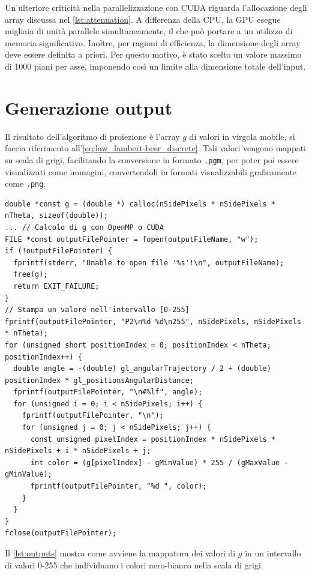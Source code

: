 \documentclass[12pt,a4paper]{report}
\begin{document}
Un'ulteriore criticità nella parallelizzazione con CUDA riguarda l'allocazione degli array discussa nel \autoref{lst:attenuation}.
A differenza della CPU, la GPU esegue migliaia di unità parallele simultaneamente, il che può portare a un utilizzo di memoria
significativo.
Inoltre, per ragioni di efficienza, la dimensione degli array deve essere definita a priori.
Per questo motivo, è stato scelto un valore massimo di 1000 piani per asse, imponendo così un limite alla dimensione totale
dell'input.

\section{Generazione output}

Il risultato dell'algoritmo di proiezione è l'array \(g\) di valori in virgola mobile, si faccia riferimento
all'\autoref{eq:law_lambert-beer_discrete}.
Tali valori vengono mappati su scala di grigi, facilitando la conversione in formato \lstinline{.pgm}, per poter poi essere
visualizzati come immagini, convertendoli in formati visualizzabili graficamente come \lstinline{.png}.

\begin{lstlisting}[language=CStyle, caption={Codice C per la mappatura dell'output in immagini.}, label={lst:outputs}]
double *const g = (double *) calloc(nSidePixels * nSidePixels * nTheta, sizeof(double));
... // Calcolo di g con OpenMP o CUDA
FILE *const outputFilePointer = fopen(outputFileName, "w");
if (!outputFilePointer) {
  fprintf(stderr, "Unable to open file '%s'!\n", outputFileName);
  free(g);
  return EXIT_FAILURE;
}
// Stampa un valore nell'intervallo [0-255]
fprintf(outputFilePointer, "P2\n%d %d\n255", nSidePixels, nSidePixels * nTheta);
for (unsigned short positionIndex = 0; positionIndex < nTheta; positionIndex++) {
  double angle = -(double) gl_angularTrajectory / 2 + (double) positionIndex * gl_positionsAngularDistance;
  fprintf(outputFilePointer, "\n#%lf", angle);
  for (unsigned i = 0; i < nSidePixels; i++) {
    fprintf(outputFilePointer, "\n");
    for (unsigned j = 0; j < nSidePixels; j++) {
      const unsigned pixelIndex = positionIndex * nSidePixels * nSidePixels + i * nSidePixels + j;
      int color = (g[pixelIndex] - gMinValue) * 255 / (gMaxValue - gMinValue);
      fprintf(outputFilePointer, "%d ", color);
    }
  }
}
fclose(outputFilePointer);
\end{lstlisting}

Il \autoref{lst:outputs} mostra come avviene la mappatura dei valori di \(g\) in un intervallo di valori 0-255 che individuano i
colori nero-bianco nella scala di grigi.
\end{document}

